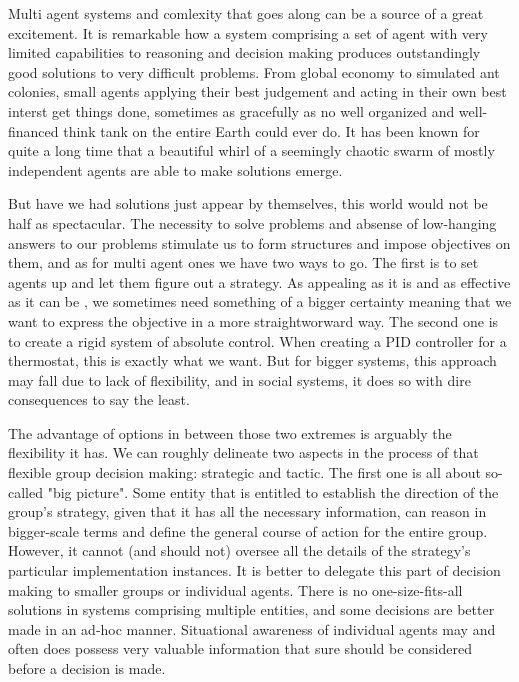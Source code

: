 Multi agent systems and comlexity that goes along can be a source of a great excitement. It is remarkable how a system
comprising a set of agent with very limited capabilities to reasoning and decision making produces outstandingly good
solutions to very difficult problems. From global economy to simulated ant colonies, small agents applying their best
judgement and acting in their own best interst get things done, sometimes as gracefully as no well organized and
well-financed think tank on the entire Earth could ever do. It has been known for quite a long time that a beautiful
whirl of a seemingly chaotic swarm of mostly independent agents are able to make solutions emerge.

But have we had solutions just appear by themselves, this world would not be half as spectacular. The necessity to solve
problems and absense of low-hanging answers to our problems stimulate us to form structures and impose objectives on
them, and as for multi agent ones we have two ways to go. The first is to set agents up and let them figure out a
strategy. As appealing as it is and as effective as it can be \cite{dorigo-2006}, we sometimes need something of a
bigger certainty meaning that we want to express the objective in a more straightworward way. The second one is to
create a rigid system of absolute control. When creating a PID controller for a thermostat, this is exactly what we
want. But for bigger systems, this approach may fall due to lack of flexibility, and in social systems, it does so with
dire consequences to say the least.

The advantage of options in between those two extremes is arguably the flexibility it has. We can roughly delineate two
aspects in the process of that flexible group decision making: strategic and tactic. The first one is all about
so-called "big picture". Some entity that is entitled to establish the direction of the group's strategy, given that it
has all the necessary information, can reason in bigger-scale terms and define the general course of action for the
entire group. However, it cannot (and should not) oversee all the details of the strategy's particular implementation
instances. It is better to delegate this part of decision making to smaller groups or individual agents. There is no
one-size-fits-all solutions in systems comprising multiple entities, and some decisions are better made in an ad-hoc
manner.
Situational awareness \cite{endsley-1995} of individual agents may and often does possess very valuable information that
sure should be considered before a decision is made.

